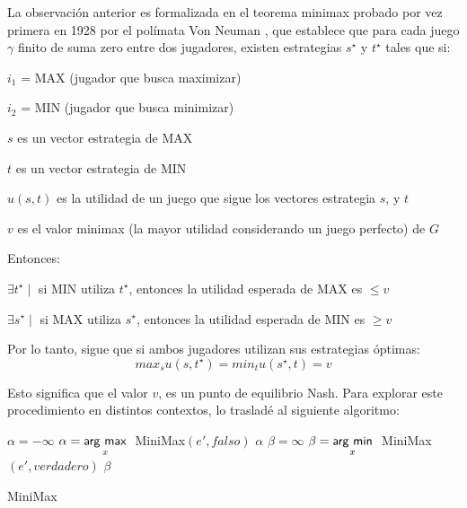 \clearpage
La observación anterior es formalizada en el teorema minimax probado por vez primera en 1928 por el polímata Von Neuman\autocite[5]{hajiaghayi_28._2011-1} , que establece que para cada juego $\gamma$ finito de suma zero entre dos jugadores, existen estrategias $s^\star$ y $t^\star$ tales que si: 
\begin{enumitem}
\item $i_{1}$ = MAX (jugador que busca maximizar)
\item $i_{2}$ = MIN (jugador que busca minimizar)
\item $s$ es un vector estrategia de MAX
\item $t$ es un vector estrategia de MIN
\item $u(s,t)$ es la utilidad de un juego que sigue los vectores estrategia $s$, y $t$
\item $v$ es el valor minimax (la mayor utilidad considerando un juego perfecto) de $G$
\end{enumitem}

Entonces: 
\begin{enumitem}
\item $\exists t^\star \mid$ si MIN utiliza $t^\star$, entonces la utilidad esperada de MAX es $\leq v$ 
\item $\exists s^\star \mid$ si MAX utiliza $s^\star$, entonces la utilidad esperada de MIN es $\geq v$ 
\end{enumitem}

Por lo tanto, sigue que si ambos jugadores utilizan sus estrategias óptimas:
\begin{equation}
max_{s}u(s,t^\star) = min_{t}u(s^\star,t) = v
\end{equation}

Esto significa que el valor $v$, es un punto de equilibrio Nash\autocite[6]{hajiaghayi_28._2011-1}.
\clearpage
Para explorar este procedimiento en distintos contextos, lo trasladé al siguiente algoritmo\autocite[2]{weibul_game_2011}: 
\begin{algorithm}
\begin{algorithmic}
  \State {}
  \State {}
  \Else
  \State {}
  \EndIf
  \Else
  \State $\alpha = -\infty$
  \State $\alpha = \underset{x}{\operatorname{\mathsf{arg}}\,\operatorname{\mathsf{max}}}\;$ MiniMax$(e', falso)$
  \EndFor
  \State \Return  $\alpha$
  \Else
  \State $\beta = \infty$
  \State $\beta = \underset{x}{\operatorname{\mathsf{arg}}\,\operatorname{\mathsf{min}}}\;$ MiniMax$(e', verdadero)$
  \EndFor
  \State \Return  $\beta$
  \EndIf
  \EndIf
\EndProcedure
\end{algorithmic}
\caption{MiniMax\label{alg:MiniMax}}
\end{algorithm}

